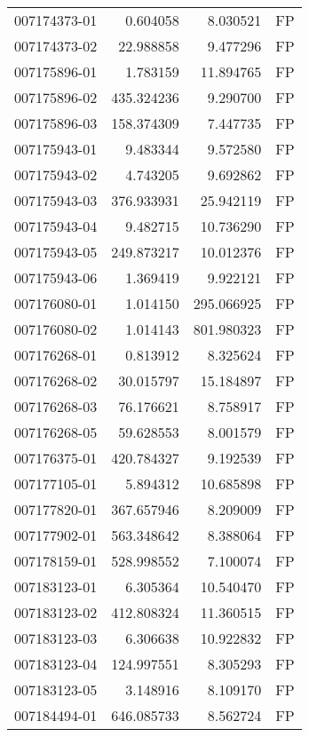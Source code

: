 \begin{tabular}{lrrl}
007174373-01 &    0.604058 &       8.030521 &   FP \\
007174373-02 &   22.988858 &       9.477296 &   FP \\
007175896-01 &    1.783159 &      11.894765 &   FP \\
007175896-02 &  435.324236 &       9.290700 &   FP \\
007175896-03 &  158.374309 &       7.447735 &   FP \\
007175943-01 &    9.483344 &       9.572580 &   FP \\
007175943-02 &    4.743205 &       9.692862 &   FP \\
007175943-03 &  376.933931 &      25.942119 &   FP \\
007175943-04 &    9.482715 &      10.736290 &   FP \\
007175943-05 &  249.873217 &      10.012376 &   FP \\
007175943-06 &    1.369419 &       9.922121 &   FP \\
007176080-01 &    1.014150 &     295.066925 &   FP \\
007176080-02 &    1.014143 &     801.980323 &   FP \\
007176268-01 &    0.813912 &       8.325624 &   FP \\
007176268-02 &   30.015797 &      15.184897 &   FP \\
007176268-03 &   76.176621 &       8.758917 &   FP \\
007176268-05 &   59.628553 &       8.001579 &   FP \\
007176375-01 &  420.784327 &       9.192539 &   FP \\
007177105-01 &    5.894312 &      10.685898 &   FP \\
007177820-01 &  367.657946 &       8.209009 &   FP \\
007177902-01 &  563.348642 &       8.388064 &   FP \\
007178159-01 &  528.998552 &       7.100074 &   FP \\
007183123-01 &    6.305364 &      10.540470 &   FP \\
007183123-02 &  412.808324 &      11.360515 &   FP \\
007183123-03 &    6.306638 &      10.922832 &   FP \\
007183123-04 &  124.997551 &       8.305293 &   FP \\
007183123-05 &    3.148916 &       8.109170 &   FP \\
007184494-01 &  646.085733 &       8.562724 &   FP \\

\end{tabular}
